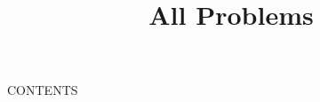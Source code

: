 \documentclass[12pt,letterpaper,answers]{exam}
\title{All Problems}
\begin{document}
\maketitle

\tableofcontents

CONTENTS
\end{document}
